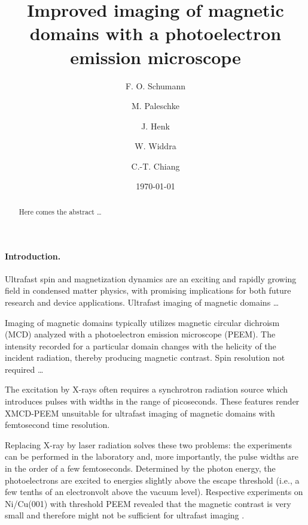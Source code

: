 \documentclass[prl,twocolumn,floatfix]{revtex4-2}
\begin{document}
\title{Improved imaging of magnetic domains with a photoelectron emission microscope}

\author{F. O. Schumann}

\author{M. Paleschke}
\author{J. Henk}
\author{W. Widdra}

\author{C.-T. Chiang}

\date{\today}

\begin{abstract}
Here comes the abstract \ldots
\end{abstract}

\pacs{}

\maketitle

\paragraph{Introduction.} Ultrafast spin and magnetization dynamics are an exciting and rapidly growing field in condensed matter physics, with promising implications for both future research and device applications. Ultrafast imaging of magnetic domains \ldots

Imaging of magnetic domains typically utilizes magnetic circular dichroism (MCD) analyzed with a photoelectron emission microscope (PEEM). The intensity recorded for a particular domain changes with the helicity of the incident radiation, thereby producing magnetic contrast. Spin resolution not required \ldots

The excitation by X-rays often requires a synchrotron radiation source which introduces pulses with widths in the range of picoseconds. These features render XMCD-PEEM unsuitable for ultrafast imaging of magnetic domains with femtosecond time resolution.

Replacing X-ray by laser radiation solves these two problems: the experiments can be performed in the laboratory and, more importantly, the pulse widths are in the order of a few femtoseconds. Determined by the photon energy, the photoelectrons are excited to energies slightly above the escape threshold (i.e., a few tenths of an electronvolt above the vacuum level). Respective experiments on Ni/Cu(001) with threshold PEEM revealed that the magnetic contrast is very small and therefore might not be sufficient for ultrafast imaging .
\end{document}
